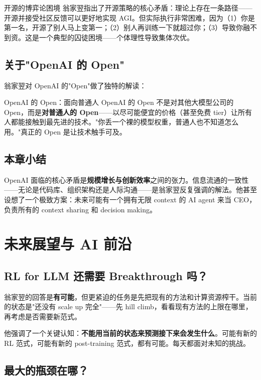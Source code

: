 \documentclass[a4paper]{article}
\begin{document}
\begin{knowledgebox}{开源的博弈论困境}
翁家翌指出了开源策略的核心矛盾：理论上存在一条路径——开源并接受社区反馈可以更好地实现 AGI。但实际执行非常困难，因为（1）你是第一名，开源了别人马上变第一；（2）别人再训练一下就超过你；（3）导致你融不到资。这是一个典型的囚徒困境——个体理性导致集体次优。
\end{knowledgebox}

\subsection{关于"OpenAI 的 Open"}

翁家翌对 OpenAI 的"Open"做了独特的解读：

\begin{importantbox}{OpenAI 的 Open：面向普通人}
OpenAI 的 Open 不是对其他大模型公司的 Open，而是\textbf{对普通人的 Open}——以尽可能便宜的价格（甚至免费 tier）让所有人都能接触到最先进的技术。"你丢一个裸的模型权重，普通人也不知道怎么用。"真正的 Open 是让技术触手可及。
\end{importantbox}

\subsection{本章小结}

OpenAI 面临的核心矛盾是\textbf{规模增长与创新效率}之间的张力。信息流通的一致性——无论是代码库、组织架构还是人际沟通——是翁家翌反复强调的解法。他甚至设想了一个极致方案：未来可能有一个拥有无限 context 的 AI agent 来当 CEO，负责所有的 context sharing 和 decision making。


\section{未来展望与 AI 前沿}

\subsection{RL for LLM 还需要 Breakthrough 吗？}

翁家翌的回答是\textbf{有可能}，但更紧迫的任务是先把现有的方法和计算资源榨干。当前的状态是"还没有 scale up 完全"——先 hill climb，看看现有方法的上限在哪里，再考虑是否需要新范式。

他强调了一个关键认知：\textbf{不能用当前的状态来预测接下来会发生什么}。可能有新的 RL 范式，可能有新的 post-training 范式，都有可能。每天都面对未知的挑战。

\subsection{最大的瓶颈在哪？}
\end{document}
